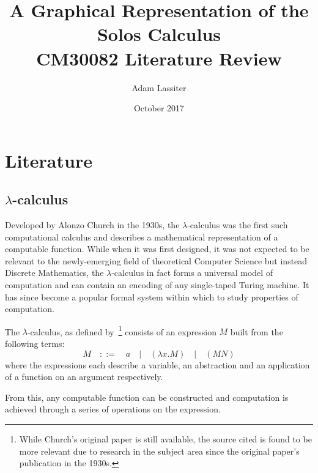 \documentclass{article}
\title{A Graphical Representation of the Solos Calculus \\
	\large CM30082 Literature Review}
\author{Adam Lassiter}
\date{October 2017}
\begin{document}
\maketitle

\vfill

\tableofcontents

\pagebreak



\section{Literature}

    \subsection{$\lambda$-calculus}

        Developed by Alonzo Church in the 1930s, the $\lambda$-calculus was the first such computational calculus and describes a mathematical representation of a computable function.
        While when it was first designed, it was not expected to be relevant to the newly-emerging field of theoretical Computer Science but instead Discrete Mathematics, the $\lambda$-calculus in fact forms a universal model of computation and can contain an encoding of any single-taped Turing machine.
        It has since become a popular formal system within which to study properties of computation.
        
        \label{ssubsec:lambda-calculus}
        \begin{definition}
            The $\lambda$-calculus, as defined by~\cite{lambda-calculus}\footnote{While Church's original paper is still available, the source cited is found to be more relevant due to research in the subject area since the original paper's publication in the 1930s.} consists of an expression $M$ built from the following terms:
            \begin{equation}
                M  \quad::=\quad  a  \quad|\quad  (\lambda x . M)  \quad|\quad  (M N)
            \end{equation}
            where the expressions each describe a variable, an abstraction and an application of a function on an argument respectively.
        \end{definition}
        From this, any computable function can be constructed and computation is achieved through a series of operations on the expression.
\end{document}
